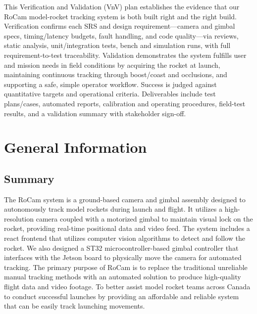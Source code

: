 \documentclass[12pt, titlepage]{article}
\begin{document}


\newpage


This Verification and Validation (VnV) plan establishes the evidence that our 
RoCam model-rocket tracking system is both built right and the right build. 
Verification confirms each SRS and design requirement—camera and gimbal specs, 
timing/latency budgets, fault handling, and code quality—via reviews, static 
analysis, unit/integration tests, bench and simulation runs, with full 
requirement-to-test traceability. Validation demonstrates the system fulfills 
user and mission needs in field conditions by acquiring the rocket at launch, 
maintaining continuous tracking through boost/coast and occlusions, and supporting 
a safe, simple operator workflow. Success is judged against quantitative targets 
and operational criteria. Deliverables include test plans/cases, 
automated reports, calibration and operating procedures, field-test results, 
and a validation summary with stakeholder sign-off.


\section{General Information}

\subsection{Summary}

The RoCam system is a ground-based camera and gimbal assembly designed to autonomously
track model rockets during launch and flight. It utilizes a high-resolution camera
coupled with a motorized gimbal to maintain visual lock on the rocket, providing
real-time positional data and video feed. The system includes a react frontend that
utilizes computer vision algorithms to detect and follow the rocket. We also designed a
ST32 microcontroller-based gimbal controller that interfaces with the Jetson board to
physically move the camera for automated tracking. The primary purpose of RoCam is 
to replace the traditional unreliable manual tracking methods with an automated solution
to produce high-quality flight data and video footage. To better assist model rocket teams
across Canada to conduct successful launches by providing an affordable and reliable system
that can be easily track launching movements.
\end{document}
